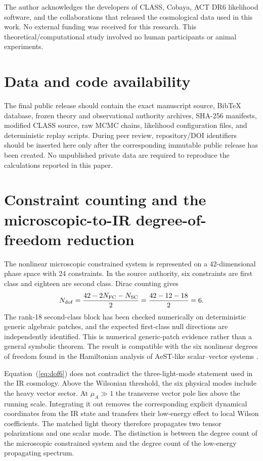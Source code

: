 \documentclass[12pt]{iopart}
\begin{document}
\ack
The author acknowledges the developers of CLASS, Cobaya, ACT DR6 likelihood software, and the collaborations that released the cosmological data used in this work.  No external funding was received for this research.  This theoretical/computational study involved no human participants or animal experiments.

\section*{Data and code availability}
The final public release should contain the exact manuscript source, BibTeX database, frozen theory and observational authority archives, SHA-256 manifests, modified CLASS source, raw MCMC chains, likelihood configuration files, and deterministic replay scripts.  During peer review, repository/DOI identifiers should be inserted here only after the corresponding immutable public release has been created.  No unpublished private data are required to reproduce the calculations reported in this paper.

\appendix

\section{Constraint counting and the microscopic-to-IR degree-of-freedom reduction}
\label{app:constraints}

The nonlinear microscopic constrained system is represented on a 42-dimensional phase space with 24 constraints.  In the source authority, six constraints are first class and eighteen are second class.  Dirac counting gives
\begin{equation}
N_{\rm dof}=\frac{42-2N_{\rm FC}-N_{\rm SC}}{2}
=\frac{42-12-18}{2}=6.
\label{eq:dof6}
\end{equation}
The rank-18 second-class block has been checked numerically on deterministic generic algebraic patches, and the expected first-class null directions are independently identified.  This is numerical generic-patch evidence rather than a general symbolic theorem.  The result is compatible with the six nonlinear degrees of freedom found in the Hamiltonian analysis of AeST-like scalar--vector systems \cite{BatakiSkordisZlosnik2024}.

Equation~(\ref{eq:dof6}) does not contradict the three-light-mode statement used in the IR cosmology.  Above the Wilsonian threshold, the six physical modes include the heavy vector sector.  At $\mu_A\gg1$ the transverse vector pole lies above the running scale.  Integrating it out removes the corresponding explicit dynamical coordinates from the IR state and transfers their low-energy effect to local Wilson coefficients.  The matched light theory therefore propagates two tensor polarizations and one scalar mode.  The distinction is between the degree count of the microscopic constrained system and the degree count of the low-energy propagating spectrum.
\end{document}
